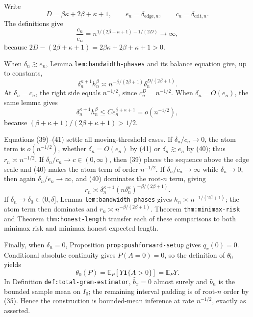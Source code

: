 Write
\[
 D=\beta\kappa+2\beta+\kappa+1,
 \qquad
 e_n=\delta_{\mathrm{edge},n},
 \qquad
 c_n=\delta_{\mathrm{crit},n}.
\]
The definitions give
\[
 \frac{c_n}{e_n}
 =n^{1/(2\beta+\kappa+1)-1/(2D)}\longrightarrow\infty, \tag{39}
\]
because \(2D-(2\beta+\kappa+1)=2\beta\kappa+2\beta+\kappa+1>0\).

When \(\delta_n\gtrsim e_n\), Lemma \texttt{lem:bandwidth-phases} and its balance equation give, up to constants,
\[
 \delta_n^{\kappa+1}h_n^\beta
 \asymp n^{-\beta/(2\beta+1)}
 \delta_n^{D/(2\beta+1)}. \tag{40}
\]
At \(\delta_n=c_n\), the right side equals \(n^{-1/2}\), since \(c_n^D=n^{-1/2}\).  When \(\delta_n=O(e_n)\), the same lemma gives
\[
 \delta_n^{\kappa+1}h_n^\beta
 \leq C e_n^{\beta+\kappa+1}
 =o(n^{-1/2}), \tag{41}
\]
because \((\beta+\kappa+1)/(2\beta+\kappa+1)>1/2\).

Equations (39)--(41) settle all moving-threshold cases.  If \(\delta_n/c_n\to0\), the atom term is \(o(n^{-1/2})\), whether \(\delta_n=O(e_n)\) by (41) or \(\delta_n\gtrsim e_n\) by (40); thus \(r_n\asymp n^{-1/2}\).  If \(\delta_n/c_n\to c\in(0,\infty)\), then (39) places the sequence above the edge scale and (40) makes the atom term of order \(n^{-1/2}\).  If \(\delta_n/c_n\to\infty\) while \(\delta_n\to0\), then again \(\delta_n/e_n\to\infty\), and (40) dominates the root-\(n\) term, giving
\[
 r_n\asymp\delta_n^{\kappa+1}(n\delta_n^\kappa)^{-\beta/(2\beta+1)}.
\]
If \(\delta_n\to\delta_0\in(0,\bar\delta]\), Lemma \texttt{lem:bandwidth-phases} gives \(h_n\asymp n^{-1/(2\beta+1)}\); the atom term then dominates and \(r_n\asymp n^{-\beta/(2\beta+1)}\).  Theorem \texttt{thm:minimax-risk} and Theorem \texttt{thm:honest-length} transfer each of these comparisons to both minimax risk and minimax honest expected length.

Finally, when \(\delta_n=0\), Proposition \texttt{prop:pushforward-setup} gives \(q_x(0)=0\).  Conditional absolute continuity gives \(P(A=0)=0\), so the definition of \(\theta_0\) yields
\[
 \theta_0(P)=\mathbb E_P[Y\mathbf 1\{A>0\}]=\mathbb E_PY.
\]
In Definition \texttt{def:total-gram-estimator}, \(\widehat b_x=0\) almost surely and \(\widehat\nu_n\) is the bounded sample mean on \(I_0\); the remaining interval padding is of root-\(n\) order by (35).  Hence the construction is bounded-mean inference at rate \(n^{-1/2}\), exactly as asserted.